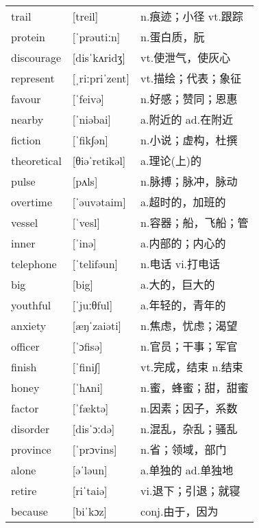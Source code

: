 \documentclass[a4paper]{article}
\begin{document}
\section{}
\begin{tabular}{l l l}

trail & [treil] & n.痕迹；小径 vt.跟踪 \\
protein & [ˈprəutiːn] & n.蛋白质，朊 \\
discourage & [disˈkʌridʒ] & vt.使泄气，使灰心 \\
represent & [ˌriːpriˈzent] & vt.描绘；代表；象征 \\
favour & [ˈfeivə] & n.好感；赞同；恩惠 \\
nearby & [ˈniəbai] & a.附近的 ad.在附近 \\
fiction & [ˈfik∫ən] & n.小说；虚构，杜撰 \\
theoretical & [θiəˈretikəl] & a.理论(上)的 \\
pulse & [pʌls] & n.脉搏；脉冲，脉动 \\
overtime & [ˈəuvətaim] & a.超时的，加班的 \\
vessel & [ˈvesl] & n.容器；船，飞船；管 \\
inner & [ˈinə] & a.内部的；内心的 \\
telephone & [ˈtelifəun] & n.电话 vi.打电话 \\
big & [big] & a.大的，巨大的 \\
youthful & [ˈjuːθful] & a.年轻的，青年的 \\
anxiety & [æŋˈzaiəti] & n.焦虑，忧虑；渴望 \\
officer & [ˈɔfisə] & n.官员；干事；军官 \\
finish & [ˈfini∫] & vt.完成，结束 n.结束 \\
honey & [ˈhʌni] & n.蜜，蜂蜜；甜，甜蜜 \\
factor & [ˈfæktə] & n.因素；因子，系数 \\
disorder & [disˈɔːdə] & n.混乱，杂乱；骚乱 \\
province & [ˈprɔvins] & n.省；领域，部门 \\
alone & [əˈləun] & a.单独的 ad.单独地 \\
retire & [riˈtaiə] & vi.退下；引退；就寝 \\
because & [biˈkɔz] & conj.由于，因为 \\

\end{tabular}
\end{document}
